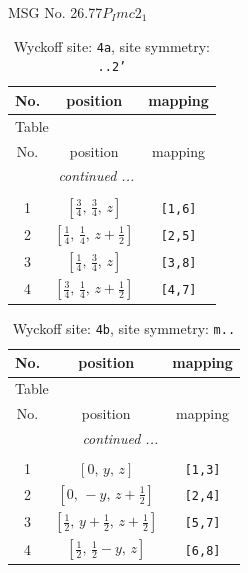 \documentclass[fleqn,8pt]{jsarticle}
\begin{document}
\setcounter{MaxMatrixCols}{32}

\renewcommand{\tablename}{Table~}
\renewcommand{\figurename}{Figure~}
\begin{center}
\LARGE
MSG No. 26.77\quad$P_{I}mc2_{1}$
\end{center}
\renewcommand{\arraystretch}{1.2}
\begin{longtable}{ccc}
\caption{Wyckoff site: {\tt 4a}, site symmetry: {\tt ..2'}}
 \\
 \hline \hline
No. & position & mapping \\ \hline \endfirsthead

\multicolumn{2}{l}{\tablename\ \thetable{}} \\
 \hline \hline
No. & position & mapping \\ \hline \endhead

 \hline \hline
\multicolumn{2}{r}{\footnotesize\it continued ...} \\ \endfoot

 \hline \hline
\multicolumn{2}{r}{} \\ \endlastfoot

1 & $\left[ \frac{3}{4},\, \frac{3}{4},\, z \right]$ & {\tt [1,6]} \\ \hline
2 & $\left[ \frac{1}{4},\, \frac{1}{4},\, z + \frac{1}{2} \right]$ & {\tt [2,5]} \\ \hline
3 & $\left[ \frac{1}{4},\, \frac{3}{4},\, z \right]$ & {\tt [3,8]} \\ \hline
4 & $\left[ \frac{3}{4},\, \frac{1}{4},\, z + \frac{1}{2} \right]$ & {\tt [4,7]} \\
\end{longtable}
\renewcommand{\arraystretch}{1.2}
\begin{longtable}{ccc}
\caption{Wyckoff site: {\tt 4b}, site symmetry: {\tt m..}}
 \\
 \hline \hline
No. & position & mapping \\ \hline \endfirsthead

\multicolumn{2}{l}{\tablename\ \thetable{}} \\
 \hline \hline
No. & position & mapping \\ \hline \endhead

 \hline \hline
\multicolumn{2}{r}{\footnotesize\it continued ...} \\ \endfoot

 \hline \hline
\multicolumn{2}{r}{} \\ \endlastfoot

1 & $\left[ 0,\, y,\, z \right]$ & {\tt [1,3]} \\ \hline
2 & $\left[ 0,\, - y,\, z + \frac{1}{2} \right]$ & {\tt [2,4]} \\ \hline
3 & $\left[ \frac{1}{2},\, y + \frac{1}{2},\, z + \frac{1}{2} \right]$ & {\tt [5,7]} \\ \hline
4 & $\left[ \frac{1}{2},\, \frac{1}{2} - y,\, z \right]$ & {\tt [6,8]} \\
\end{longtable}
\end{document}
